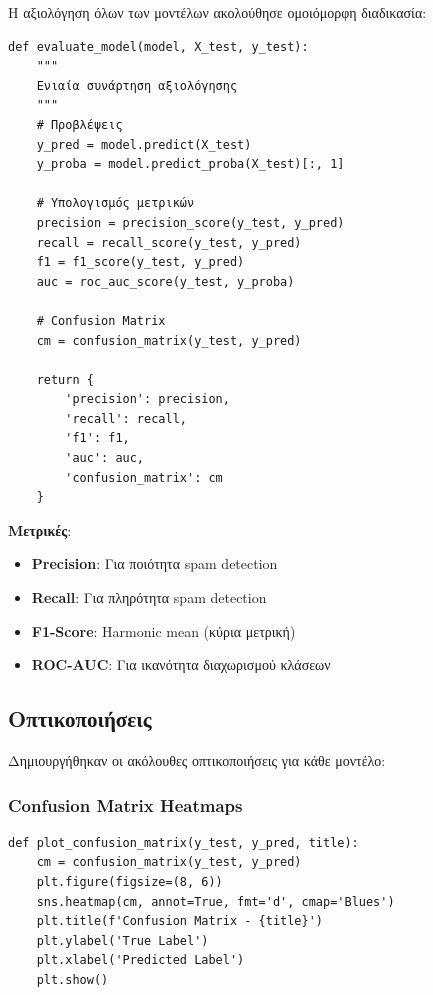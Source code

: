 \documentclass[12pt,a4paper,twoside]{book}
\begin{document}
Η αξιολόγηση όλων των μοντέλων ακολούθησε ομοιόμορφη διαδικασία:

\begin{tcolorbox}[myCustomStyle={Unified Evaluation Pipeline}]
    \begin{lstlisting}[style=myPythonStyle]
def evaluate_model(model, X_test, y_test):
    """
    Ενιαία συνάρτηση αξιολόγησης
    """
    # Προβλέψεις
    y_pred = model.predict(X_test)
    y_proba = model.predict_proba(X_test)[:, 1]
    
    # Υπολογισμός μετρικών
    precision = precision_score(y_test, y_pred)
    recall = recall_score(y_test, y_pred)
    f1 = f1_score(y_test, y_pred)
    auc = roc_auc_score(y_test, y_proba)
    
    # Confusion Matrix
    cm = confusion_matrix(y_test, y_pred)
    
    return {
        'precision': precision,
        'recall': recall,
        'f1': f1,
        'auc': auc,
        'confusion_matrix': cm
    }
\end{lstlisting}
\end{tcolorbox}

\textbf{Μετρικές}:
\begin{itemize}
    \item \textbf{Precision}: Για ποιότητα spam detection
    \item \textbf{Recall}: Για πληρότητα spam detection
    \item \textbf{F1-Score}: Harmonic mean (κύρια μετρική)
    \item \textbf{ROC-AUC}: Για ικανότητα διαχωρισμού κλάσεων
\end{itemize}

\subsection{Οπτικοποιήσεις}

Δημιουργήθηκαν οι ακόλουθες οπτικοποιήσεις για κάθε μοντέλο:

\subsubsection{Confusion Matrix Heatmaps}

\begin{tcolorbox}[myCustomStyle={Confusion Matrix Plotting}]
    \begin{lstlisting}[style=myPythonStyle]
def plot_confusion_matrix(y_test, y_pred, title):
    cm = confusion_matrix(y_test, y_pred)
    plt.figure(figsize=(8, 6))
    sns.heatmap(cm, annot=True, fmt='d', cmap='Blues')
    plt.title(f'Confusion Matrix - {title}')
    plt.ylabel('True Label')
    plt.xlabel('Predicted Label')
    plt.show()
\end{lstlisting}
\end{tcolorbox}
\end{document}
